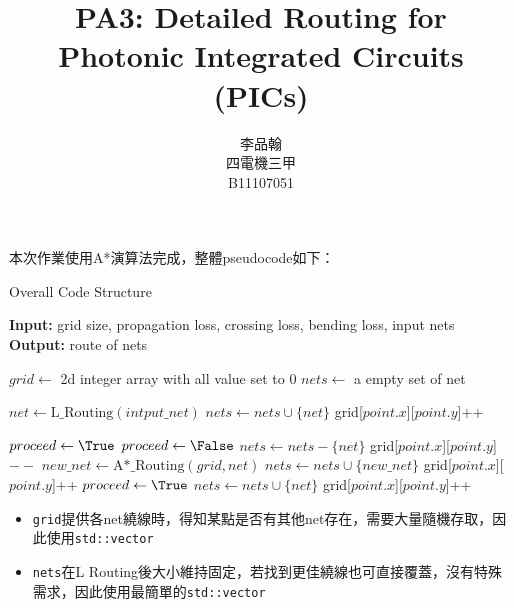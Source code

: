 \documentclass{article}
\title{PA3: Detailed Routing for Photonic Integrated Circuits (PICs)}
\author{
  李品翰 \\
  四電機三甲 \\
  B11107051
}
\date{}
\begin{document}
\maketitle

本次作業使用A*演算法完成，整體pseudocode如下：

\begin{algorithm}
\caption{Overall Code Structure}
\textbf{Input:} grid size, propagation loss, crossing loss, bending loss, input nets \\
\textbf{Output:} route of nets
\begin{algorithmic}

\State $grid \gets$ 2d integer array with all value set to 0 
\State $nets \gets$ a empty set of net 

    \State $net\gets\textrm{L\_Routing}(intput\_net)$ 
    \State $nets \gets nets \cup \{net\}$
     grid[$point.x$][$point.y$]++ \EndFFor
\EndFor

\State $proceed \gets \True$
 
    \State $proceed \gets \False$
        \State $nets \gets nets - \{net\}$ 
         grid[$point.x$][$point.y$]$--$ \EndFFor {}
        \State $new\_net \gets \textrm{A*\_Routing}(grid, net)$
            \State $nets \gets nets \cup \{new\_net\}$ 
             grid[$point.x$][$point.y$]++ \EndFFor {}
            \State $proceed \gets \True$
        \Else
            \State $nets \gets nets \cup \{net\}$ 
             grid[$point.x$][$point.y$]++ \EndFFor {}
        \EndIf
    \EndFor
\EndWhile

\end{algorithmic}
\end{algorithm}

\begin{itemize}
    \item \texttt{grid}提供各net繞線時，得知某點是否有其他net存在，需要大量隨機存取，因此使用\texttt{std::vector}
    \item \texttt{nets}在L Routing後大小維持固定，若找到更佳繞線也可直接覆蓋，沒有特殊需求，因此使用最簡單的\texttt{std::vector}
\end{itemize}
\end{document}

